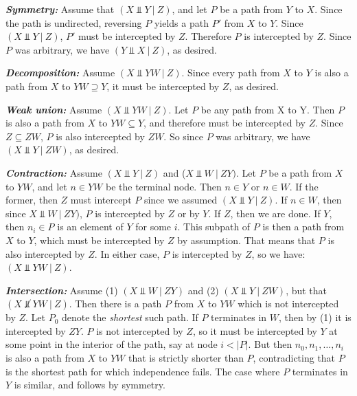 \documentclass{article}
\newcommand{\given}{\ |\ }
\begin{document}
\textit{\textbf{Symmetry:}} Assume that $(X \Perp Y \given Z)$, and let $P$ be a path from $Y$ to $X$. Since the path is undirected, reversing $P$ yields a path $P'$ from $X$ to $Y$.  Since $(X \Perp Y \given Z)$, $P'$ must be intercepted by $Z$. Therefore $P$ is intercepted by $Z$. Since $P$ was arbitrary, we have $(Y \Perp X \given Z)$, as desired.

\textit{\textbf{Decomposition:}} Assume $(X \Perp YW \given Z)$. Since every path from $X$ to $Y$ is also a path from $X$ to $YW\supseteq Y$, it must be intercepted by $Z$, as desired.

\textit{\textbf{Weak union:}} Assume $(X \Perp YW \given Z)$. Let $P$ be any path from X to Y. Then $P$ is also a path from $X$ to $YW\subseteq Y$, and therefore must be intercepted by $Z$. Since $Z\subseteq ZW$, $P$ is also intercepted by $ZW$. So since $P$ was arbitrary, we have $(X \Perp Y \given ZW)$, as desired.

\textit{\textbf{Contraction:}} Assume $(X \Perp Y \given Z)$ and ($X \Perp W \given ZY)$.  Let $P$ be a path from $X$ to $YW$, and let $n\in YW$ be the terminal node. Then $n\in Y$ or $n\in W$. If the former, then $Z$ must intercept $P$ since we assumed $(X \Perp Y \given Z)$. If $n\in W$, then since $X \Perp W \given ZY)$, $P$ is intercepted by $Z$ or by $Y$. If $Z$, then we are done. If $Y$, then $n_i\in P$ is an element of $Y$ for some $i$. This subpath of $P$ is then a path from $X$ to $Y$, which must be intercepted by $Z$ by assumption. That means that $P$ is also intercepted by $Z$. In either case, $P$ is intercepted by $Z$, so we have: $(X \Perp YW \given Z)$.

\textit{\textbf{Intersection:}} Assume (1) $(X \Perp W \given ZY)$ and (2) $(X \Perp Y \given ZW)$, but that $(X \not \Perp YW \given Z)$. Then there is a path $P$ from $X$ to $YW$ which is not intercepted by $Z$. Let $P_0$ denote the \textit{shortest} such path. If $P$ terminates in $W$, then by (1) it is intercepted by $ZY$. $P$ is not intercepted by $Z$, so it must be intercepted by $Y$ at some point in the interior of the path, say at node $i < |P|$. But then $n_0,n_1,\ldots,n_i$ is also a path from $X$ to $YW$ that is strictly shorter than $P$, contradicting that $P$ is the shortest path for which independence fails. The case where $P$ terminates in $Y$ is similar, and follows by symmetry.
\end{document}
